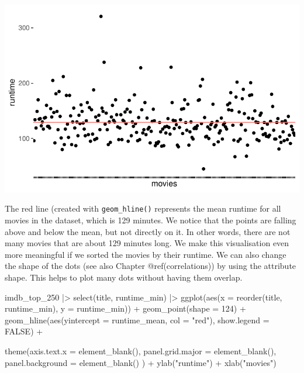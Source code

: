 \documentclass[
  letterpaper,
]{krantz}
\makeatletter
\newenvironment{Shaded}{\begin{snugshade}}{\end{snugshade}}
\newcommand{\AttributeTok}[1]{\textcolor[rgb]{0.40,0.45,0.13}{#1}}
\newcommand{\ConstantTok}[1]{\textcolor[rgb]{0.56,0.35,0.01}{#1}}
\newcommand{\DecValTok}[1]{\textcolor[rgb]{0.68,0.00,0.00}{#1}}
\newcommand{\FunctionTok}[1]{\textcolor[rgb]{0.28,0.35,0.67}{#1}}
\newcommand{\NormalTok}[1]{\textcolor[rgb]{0.00,0.23,0.31}{#1}}
\newcommand{\SpecialCharTok}[1]{\textcolor[rgb]{0.37,0.37,0.37}{#1}}
\newcommand{\StringTok}[1]{\textcolor[rgb]{0.13,0.47,0.30}{#1}}
\newenvironment{kframe}{%
\medskip{}
\setlength{\fboxsep}{.8em}
 \def\at@end@of@kframe{}%
 \ifinner\ifhmode%
  \def\at@end@of@kframe{\end{minipage}}%
  \begin{minipage}{\columnwidth}%
 \fi\fi%
 \def\FrameCommand##1{\hskip\@totalleftmargin \hskip-\fboxsep
 \colorbox{shadecolor}{##1}\hskip-\fboxsep
     \hskip-\linewidth \hskip-\@totalleftmargin \hskip\columnwidth}%
 \MakeFramed {\advance\hsize-\width
   \@totalleftmargin\z@ \linewidth\hsize
   \@setminipage}}%
 {\par\unskip\endMakeFramed%
 \at@end@of@kframe}
\renewenvironment{Shaded}{\begin{kframe}}{\end{kframe}}
\makeatother
\begin{document}
\includegraphics{08_descriptive_statistics_files/figure-pdf/sd-visualised-p1-1.pdf}

The red line (created with \texttt{geom\_hline()} represents the mean
runtime for all movies in the dataset, which is 129 minutes. We notice
that the points are falling above and below the mean, but not directly
on it. In other words, there are not many movies that are about 129
minutes long. We make this visualisation even more meaningful if we
sorted the movies by their runtime. We can also change the shape of the
dots (see also Chapter @ref(correlations)) by using the attribute shape.
This helps to plot many dots without having them overlap.

\begin{Shaded}
\begin{Highlighting}[]
\NormalTok{imdb\_top\_250 }\SpecialCharTok{|\textgreater{}}
  \FunctionTok{select}\NormalTok{(title, runtime\_min) }\SpecialCharTok{|\textgreater{}}
  \FunctionTok{ggplot}\NormalTok{(}\FunctionTok{aes}\NormalTok{(}\AttributeTok{x =} \FunctionTok{reorder}\NormalTok{(title, runtime\_min), }\AttributeTok{y =}\NormalTok{ runtime\_min)) }\SpecialCharTok{+}
  \FunctionTok{geom\_point}\NormalTok{(}\AttributeTok{shape =} \DecValTok{124}\NormalTok{) }\SpecialCharTok{+}
  \FunctionTok{geom\_hline}\NormalTok{(}\FunctionTok{aes}\NormalTok{(}\AttributeTok{yintercept =}\NormalTok{ runtime\_mean, }\AttributeTok{col =} \StringTok{"red"}\NormalTok{), }\AttributeTok{show.legend =} \ConstantTok{FALSE}\NormalTok{) }\SpecialCharTok{+}

  \FunctionTok{theme}\NormalTok{(}\AttributeTok{axis.text.x =} \FunctionTok{element\_blank}\NormalTok{(),}
        \AttributeTok{panel.grid.major =} \FunctionTok{element\_blank}\NormalTok{(),}
        \AttributeTok{panel.background =} \FunctionTok{element\_blank}\NormalTok{()}
\NormalTok{        ) }\SpecialCharTok{+}
  \FunctionTok{ylab}\NormalTok{(}\StringTok{"runtime"}\NormalTok{) }\SpecialCharTok{+}
  \FunctionTok{xlab}\NormalTok{(}\StringTok{"movies"}\NormalTok{)}
\end{Highlighting}
\end{Shaded}
\end{document}

